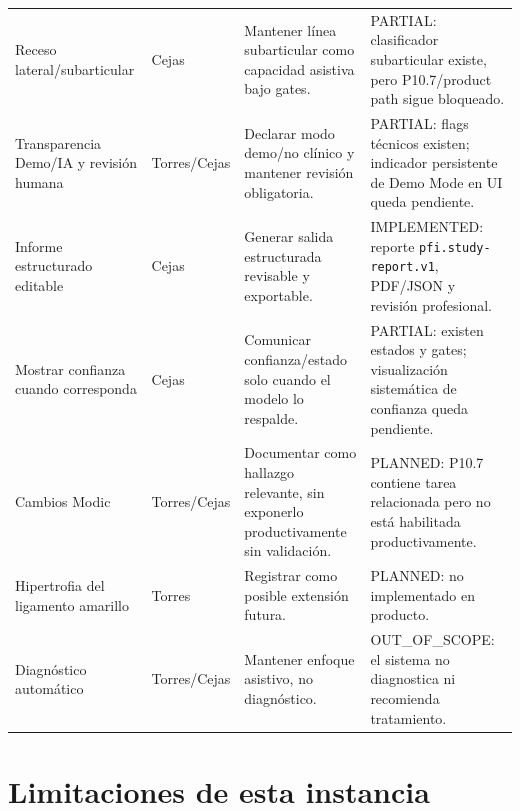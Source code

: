 {\begin{longtable}{>{\raggedright\arraybackslash}p{} >{\raggedright\arraybackslash}p{} >{\raggedright\arraybackslash}p{} >{\raggedright\arraybackslash}p{}}
Receso lateral/subarticular & Cejas & Mantener línea subarticular como capacidad asistiva bajo gates. & PARTIAL: clasificador subarticular existe, pero P10.7/product path sigue bloqueado. \\
Transparencia Demo/IA y revisión humana & Torres/Cejas & Declarar modo demo/no clínico y mantener revisión obligatoria. & PARTIAL: flags técnicos existen; indicador persistente de Demo Mode en UI queda pendiente. \\
Informe estructurado editable & Cejas & Generar salida estructurada revisable y exportable. & IMPLEMENTED: reporte \texttt{pfi.study-report.v1}, PDF/JSON y revisión profesional. \\
Mostrar confianza cuando corresponda & Cejas & Comunicar confianza/estado solo cuando el modelo lo respalde. & PARTIAL: existen estados y gates; visualización sistemática de confianza queda pendiente. \\
Cambios Modic & Torres/Cejas & Documentar como hallazgo relevante, sin exponerlo productivamente sin validación. & PLANNED: P10.7 contiene tarea relacionada pero no está habilitada productivamente. \\
Hipertrofia del ligamento amarillo & Torres & Registrar como posible extensión futura. & PLANNED: no implementado en producto. \\
Diagnóstico automático & Torres/Cejas & Mantener enfoque asistivo, no diagnóstico. & OUT\_OF\_SCOPE: el sistema no diagnostica ni recomienda tratamiento. \\
\hline
\end{longtable}
}

\section{Limitaciones de esta instancia}
\label{anexo:h-limitaciones}

